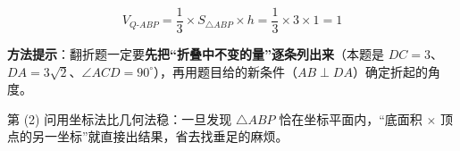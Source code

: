 \begin{answer}
\nopagebreak[4]
\[V_{Q\text{-}ABP}=\frac13\times S_{\triangle ABP}\times h=\frac13\times3\times1=1\]

\begin{gktip}
\textbf{方法提示}：翻折题一定要\textbf{先把“折叠中不变的量”逐条列出来}（本题是 $DC=3$、$DA=3\sqrt2$、$\angle ACD=90^\circ$），再用题目给的新条件（$AB\perp DA$）确定折起的角度。

第 (2) 问用坐标法比几何法稳：一旦发现 $\triangle ABP$ 恰在坐标平面内，“底面积 $\times$ 顶点的另一坐标”就直接出结果，省去找垂足的麻烦。
\end{gktip}



\par\medskip

\end{answer}
